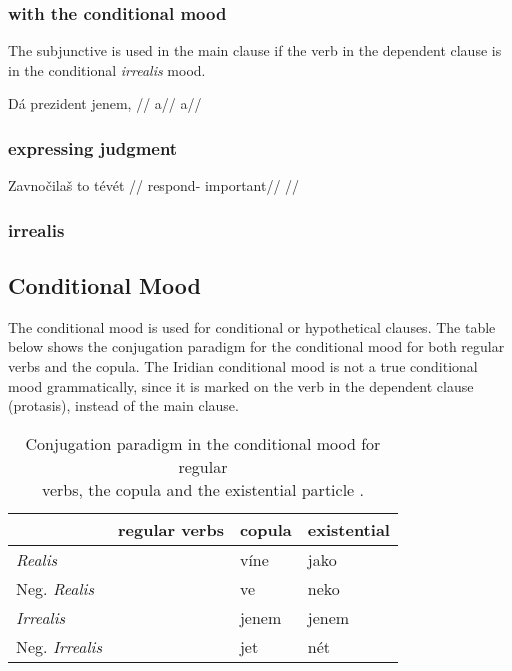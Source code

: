 \subsubsection{with the conditional mood}
\par The subjunctive is used in the main clause if the verb in the dependent clause is in the conditional \textit{irrealis} mood.

\pex
\begingl
\gla Dá prezident jenem, //
\glb a//
\glft a//
\endgl
\xe

\subsubsection{expressing judgment}

\pex
\begingl
\gla Zavnočilaš to tévét //
\glb respond-  important//
\glft {}//
\endgl
\xe

\subsubsection{irrealis}

\subsection{Conditional Mood}\label{sec:conditional}
\par The conditional mood is used for conditional or hypothetical clauses. The table below shows the conjugation paradigm for the conditional mood for both regular verbs and the copula. The Iridian conditional mood is not a true conditional mood grammatically, since it is marked on the verb in the dependent clause (protasis), instead of the main clause.

\begin{table}[h!]
	\small
	\caption{Conjugation paradigm in the conditional mood for regular \\verbs, the copula and the existential particle .}\medskip
	\begin{tabu} to 0.9 \textwidth	{Y[1.3]Y[1.3]YY}
		\toprule
		&{\cscaps regular verbs} & {\cscaps copula} & {\cscaps existential}\\
		\midrule

		\textit{Realis} 				& &víne & jako\\
		Neg. \textit{Realis}		&&ve&neko\\

		\textit{Irrealis} 			& & jenem & jenem\\
		Neg. \textit{Irrealis} 	& & jet & nét\\
		\bottomrule
	\end{tabu}
\end{table}

